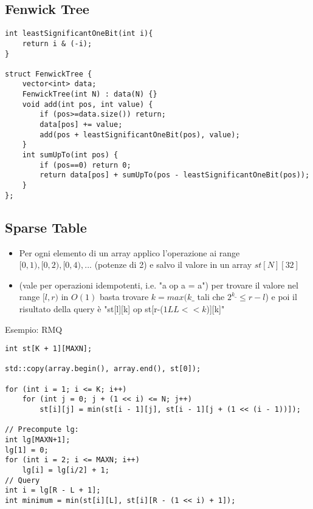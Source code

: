 \subsection{Fenwick Tree}
\begin{lstlisting}
int leastSignificantOneBit(int i){
	return i & (-i);
}

struct FenwickTree {
	vector<int> data;
	FenwickTree(int N) : data(N) {}
	void add(int pos, int value) {
		if (pos>=data.size()) return;
		data[pos] += value;
		add(pos + leastSignificantOneBit(pos), value);
	}
	int sumUpTo(int pos) {
		if (pos==0) return 0;
		return data[pos] + sumUpTo(pos - leastSignificantOneBit(pos));
	}
};
\end{lstlisting}

\subsection{Sparse Table}
\begin{itemize}
    \item Per ogni elemento di un array applico l'operazione ai range $[0,1), [0,2), [0,4), ...$ (potenze di 2) e salvo il valore in un array $st[N][32]$
    \item (vale per operazioni idempotenti, i.e. "a op a = a") per trovare il valore nel range $[l,r)$ in $O(1)$ basta trovare $k = max(k\_$ tali che $2^{k\_} \leq r-l$) e poi il risultato della query è "st[l][k] op st[r-($1LL<<k$)][k]"
\end{itemize}
Esempio: RMQ
\begin{lstlisting}
int st[K + 1][MAXN];

std::copy(array.begin(), array.end(), st[0]);

for (int i = 1; i <= K; i++)
    for (int j = 0; j + (1 << i) <= N; j++)
        st[i][j] = min(st[i - 1][j], st[i - 1][j + (1 << (i - 1))]);
        
// Precompute lg:
int lg[MAXN+1];
lg[1] = 0;
for (int i = 2; i <= MAXN; i++)
    lg[i] = lg[i/2] + 1;
// Query
int i = lg[R - L + 1];
int minimum = min(st[i][L], st[i][R - (1 << i) + 1]);
\end{lstlisting}
